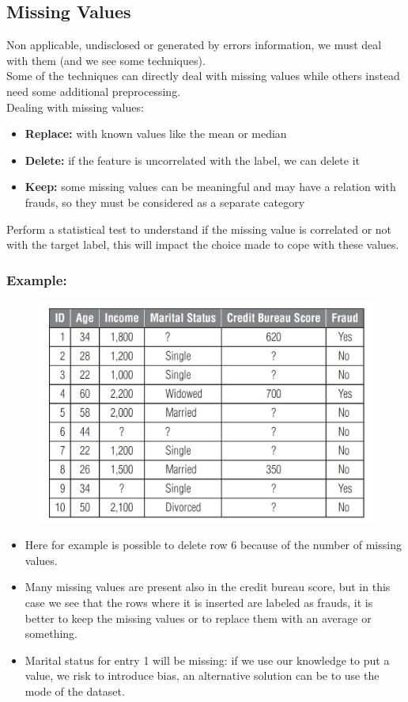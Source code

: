     \subsection{Missing Values}
        Non applicable, undisclosed or generated by errors information, we must deal with them (and we see some techniques).\\
        Some of the techniques can directly deal with missing values while others instead need some additional preprocessing.\\
        Dealing with missing values:
        \begin{itemize}
            \item \textbf{Replace:} with known values like the mean or median
            \item \textbf{Delete:} if the feature is uncorrelated with the label, we can delete it
            \item \textbf{Keep:} some missing values can be meaningful and may have a relation with frauds, so they must be considered as a separate category
        \end{itemize}
        Perform a statistical test to understand if the missing value is correlated or not with the target label, this will impact the choice made to cope with these values.
        \subsubsection{Example:}
            \begin{figure}[ht!]
                \centering
                \includegraphics[width=0.6\linewidth]{lecture_13/example.png}
            \end{figure}
            \begin{itemize}
                \item Here for example is possible to delete row 6 because of the number of missing values.
                \item Many missing values are present also in the credit bureau score, but in this case we see that the rows where it is inserted are labeled as frauds, it is better to keep the missing values or to replace them with an average or something.
                \item Marital status for entry 1 will be missing: if we use our knowledge to put a value, we risk to introduce bias, an alternative solution can be to use the mode of the dataset.
            \end{itemize}
